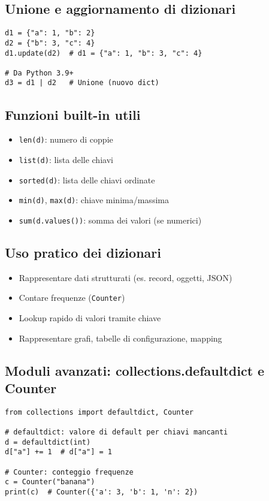 \documentclass[a4paper,12pt]{article}
\begin{document}
\subsection*{Unione e aggiornamento di dizionari}
\begin{lstlisting}
d1 = {"a": 1, "b": 2}
d2 = {"b": 3, "c": 4}
d1.update(d2)  # d1 = {"a": 1, "b": 3, "c": 4}

# Da Python 3.9+
d3 = d1 | d2   # Unione (nuovo dict)
\end{lstlisting}

\subsection*{Funzioni built-in utili}
\begin{itemize}
    \item \texttt{len(d)}: numero di coppie
    \item \texttt{list(d)}: lista delle chiavi
    \item \texttt{sorted(d)}: lista delle chiavi ordinate
    \item \texttt{min(d)}, \texttt{max(d)}: chiave minima/massima
    \item \texttt{sum(d.values())}: somma dei valori (se numerici)
\end{itemize}

\subsection*{Uso pratico dei dizionari}
\begin{itemize}
    \item Rappresentare dati strutturati (es. record, oggetti, JSON)
    \item Contare frequenze (\texttt{Counter})
    \item Lookup rapido di valori tramite chiave
    \item Rappresentare grafi, tabelle di configurazione, mapping
\end{itemize}

\subsection*{Moduli avanzati: collections.defaultdict e Counter}
\begin{lstlisting}
from collections import defaultdict, Counter

# defaultdict: valore di default per chiavi mancanti
d = defaultdict(int)
d["a"] += 1  # d["a"] = 1

# Counter: conteggio frequenze
c = Counter("banana")
print(c)  # Counter({'a': 3, 'b': 1, 'n': 2})
\end{lstlisting}
\end{document}
